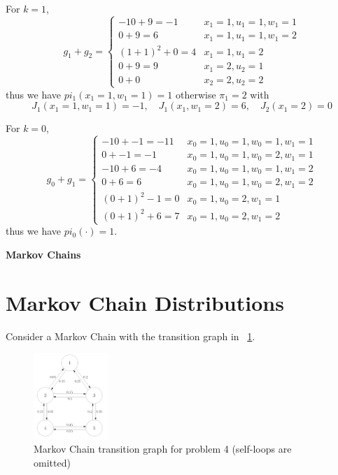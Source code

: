 \documentclass[]{article}
\begin{document}
For $k=1$, \[
    g_1 + g_2= \begin{cases}
        -10 + 9 = -1 &x_1=1, u_1 = 1, w_1 = 1\\
        0 + 9 = 6 &x_1=1, u_1 = 1, w_1 = 2\\
        (1+1)^2 + 0 = 4 &x_1 = 1, u_1 = 2\\
        0 + 9 = 9 &x_1 = 2, u_2 = 1\\
        0 + 0 &x_2 =2, u_2 = 2
    \end{cases}
\] thus we have $pi_1(x_1=1,w_1=1) = 1$ otherwise $\pi_1 = 2$ with \[
    J_1(x_1 = 1, w_1 = 1) = -1, \quad J_1(x_1, w_1=2) = 6, \quad J_2(x_1 = 2) = 0
\]

For $k=0$, \[
    g_0 + g_1 = \begin{cases}
        -10 + -1 = -11 &x_0=1, u_0 = 1, w_0 = 1, w_1 = 1\\
        0 + -1 = -1 &x_0=1, u_0 = 1, w_0 = 2, w_1 = 1\\
        -10 + 6 = -4 &x_0=1, u_0 = 1, w_0 = 1, w_1 = 2\\
        0 + 6 = 6 &x_0=1, u_0 = 1, w_0 = 2, w_1 = 2\\
        (0+1)^2 -1 = 0 &x_0=1, u_0 = 2, w_1 = 1\\
        (0+1)^2 + 6 = 7 &x_0=1, u_0 = 2, w_1 = 2
    \end{cases}
\] thus we have $pi_0(\cdot) = 1$.


\newpage
\textbf{Markov Chains}
\section{Markov Chain Distributions}
Consider a Markov Chain with the transition graph in \figurename \ \ref{fig:pblm4_markovchain}.

\begin{figure}[h]
    \centering
    \includegraphics[width=0.25\textwidth]{figs/pblm4_markovchain.png}
    \caption{Markov Chain transition graph for problem 4 (self-loops are omitted)}
    \label{fig:pblm4_markovchain}
\end{figure}
\end{document}
